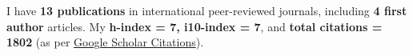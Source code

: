 \hfill
\par
I have \textbf{13 publications} in international peer-reviewed journals, including \textbf{4 first author} articles. My \textbf{h-index = 7, i10-index = 7}, and \textbf{total citations = 1802} (as per \href{https://scholar.google.com/citations?hl=en&user=6-7FYjIAAAAJ&authuser=2}{Google Scholar Citations}).

\nocite{*}


\printbibliography[heading={none},title={Journal Articles},type=article]




